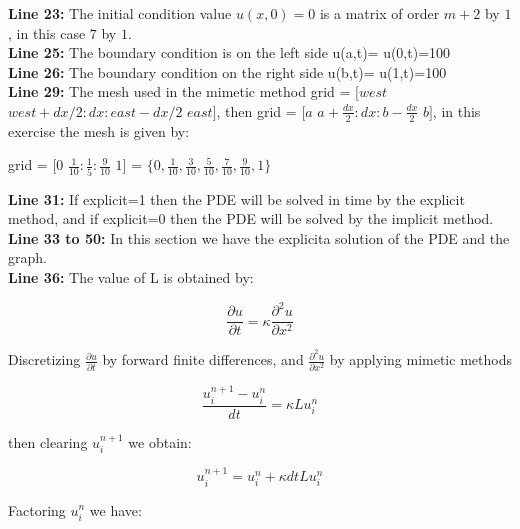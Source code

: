 \textbf{Line 23:} The initial condition  value $u(x,0)=0$ is a matrix of order $m+2$ by $1$, in this case $7$ by $1$.\\

\textbf{Line 25:} The boundary condition is on the left side u(a,t)= u(0,t)=100\\

\textbf{Line 26:} The boundary condition on the right side u(b,t)= u(1,t)=100\\

\textbf{Line 29:} The mesh used in the mimetic method  grid = $[west$  $west+dx/2: dx :east-dx/2$  $east]$, then grid = $[a$ $a+\frac{dx}{2}: dx : b-\frac{dx}{2}$ $b  ]$, in this exercise the mesh is given by:

\begin{center}

	grid = $[0$ $\frac{1}{10}: \frac{1}{5}: \frac{9}{10}$ $1]$ = $  \{0, \frac{1}{10}, \frac{3}{10}, \frac{5}{10}, \frac{7}{10}, \frac{9}{10}, 1 \}$

\end{center}

\textbf{Line 31:} If explicit=1 then the PDE will be solved in time by the explicit method, and if explicit=0 then the PDE will be solved by the implicit method.\\

\textbf{Line 33 to 50:} In this section we have the explicita solution of the PDE and the graph. \\

\textbf{Line 36:} The value of L is obtained by:

\begin{equation}
	\frac{\partial u}{\partial t} = \kappa \frac{\partial^{2} u}{\partial x^{2}}
\end{equation}

Discretizing $\frac{\partial u}{\partial t}$ by forward finite differences, and $\frac{\partial^{2} u}{\partial x^{2}}$ by applying mimetic methods

\begin{equation}
	\frac{u^{n+1}_{i} - u^{n}_{i} }{dt} = \kappa L 	u^{n}_{i}
\end{equation}

then clearing $u^{n+1}_{i}$ we obtain:


\begin{equation}
	u^{n+1}_{i} = u^{n}_{i}  +  \kappa dt L u^{n}_{i}
\end{equation}

Factoring $u^{n}_{i}$ we have:


